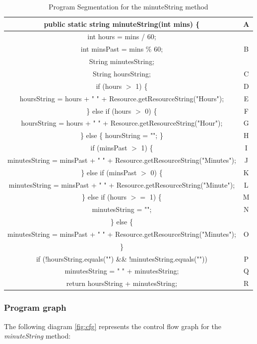 \documentclass[fontsize=12pt,paper=letter,twoside]{scrartcl}
\begin{document}
\begin{table}[h]
\centering
\begin{tabular}{|c | c |}
	\cline{1-2}
	public static string minuteString(int mins) \{ & A \\ \hline
	int hours = mins / 60; & \\ 
	int minsPast = mins \% 60; & B \\ \hline
	String minutesString; & \\ 
	String hoursString; & C \\ \hline
	if (hours $>$ 1) \{ & D \\ \hline
	hoursString = hours + " " + Resource.getResourceString("Hours"); & E \\ \hline
	\} else if (hours $>$ 0) \{ & F \\ \hline
	hoursString = hours + " " + Resource.getResourceString("Hour"); & G \\ \hline
	\} else \{ hoursString = ""; \} & H \\ \hline
	if (minsPast $>$ 1) \{ & I \\ \hline
	minutesString = minsPast + " " + Resource.getResourceString("Minutes"); & J \\ \hline
	\} else if (minsPast $>$ 0) \{ & K \\ \hline
	minutesString = minsPast + " " + Resource.getResourceString("Minute"); & L \\ \hline
	\} else if (hours $>=$ 1) \{ & M \\ \hline
	minutesString = ""; & N \\ \hline
	\} else \{ & \\ 
	minutesString = minsPast + " " + Resource.getResourceString("Minutes"); & O \\
	\} & \\ \hline
	if (!hoursString.equals("") \&\& !minutesString.equals("")) & P \\ \hline
	minutesString = " " + minutesString; & Q \\ \hline
	return hoursString + minutesString; & R \\ \hline
\end{tabular}
\caption {Program Segmentation for the minuteString method}
\label{tbl:program_segmentation}
\end{table}

\newpage
\subsubsection{Program graph}
The following diagram \ref{fig:cfg} represents the control flow graph for the \emph{minuteString} method:
\end{document}

